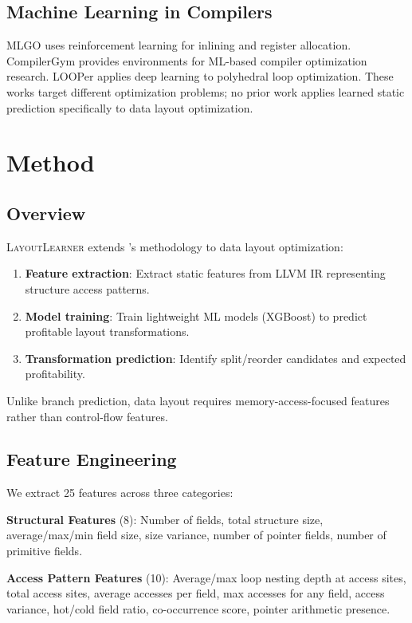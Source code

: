 \documentclass{article}
\begin{document}
\subsection{Machine Learning in Compilers}

MLGO \citep{trofin2021mlgo} uses reinforcement learning for inlining and register allocation. CompilerGym \citep{cummins2021compilergym} provides environments for ML-based compiler optimization research. LOOPer \citep{merouani2024looper} applies deep learning to polyhedral loop optimization. These works target different optimization problems; no prior work applies learned static prediction specifically to data layout optimization.

\section{Method}
\label{sec:method}

\subsection{Overview}

\textsc{LayoutLearner} extends \citeauthor{rotem2021profile}'s methodology to data layout optimization:
\begin{enumerate}
    \item \textbf{Feature extraction}: Extract static features from LLVM IR representing structure access patterns.
    \item \textbf{Model training}: Train lightweight ML models (XGBoost) to predict profitable layout transformations.
    \item \textbf{Transformation prediction}: Identify split/reorder candidates and expected profitability.
\end{enumerate}

Unlike branch prediction, data layout requires memory-access-focused features rather than control-flow features.

\subsection{Feature Engineering}

We extract 25 features across three categories:

\textbf{Structural Features} (8): Number of fields, total structure size, average/max/min field size, size variance, number of pointer fields, number of primitive fields.

\textbf{Access Pattern Features} (10): Average/max loop nesting depth at access sites, total access sites, average accesses per field, max accesses for any field, access variance, hot/cold field ratio, co-occurrence score, pointer arithmetic presence.
\end{document}
